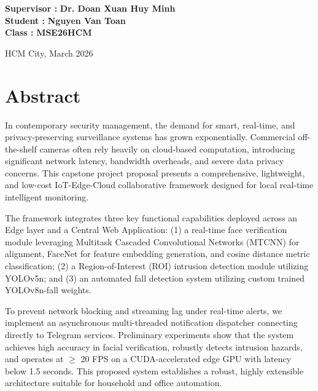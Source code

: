 \documentclass[12pt,a4paper]{article}
\begin{document}
\begin{titlepage}
\begin{center}
        \begin{flushright}
            \textbf{Supervisor :} \textbf{Dr. Doan Xuan Huy Minh} \\
            \vspace{0.5cm}
            \textbf{Student :} \textbf{Nguyen Van Toan} \\
            \vspace{0.5cm}
            \textbf{Class :} \textbf{MSE26HCM}
        \end{flushright}
        
        \vfill
        HCM City, March 2026
    \end{center}
\end{titlepage}
\hypersetup{pageanchor=true}

\newpage

\section*{Abstract}
In contemporary security management, the demand for smart, real-time, and privacy-preserving surveillance systems has grown exponentially. Commercial off-the-shelf cameras often rely heavily on cloud-based computation, introducing significant network latency, bandwidth overheads, and severe data privacy concerns. This capstone project proposal presents a comprehensive, lightweight, and low-cost IoT-Edge-Cloud collaborative framework designed for local real-time intelligent monitoring. 

The framework integrates three key functional capabilities deployed across an Edge layer and a Central Web Application: (1) a real-time face verification module leveraging Multitask Cascaded Convolutional Networks (MTCNN) for alignment, FaceNet for feature embedding generation, and cosine distance metric classification; (2) a Region-of-Interest (ROI) intrusion detection module utilizing YOLOv5n; and (3) an automated fall detection system utilizing custom trained YOLOv8n-fall weights. 

To prevent network blocking and streaming lag under real-time alerts, we implement an asynchronous multi-threaded notification dispatcher connecting directly to Telegram services. Preliminary experiments show that the system achieves high accuracy in facial verification, robustly detects intrusion hazards, and operates at $\ge$ 20 FPS on a CUDA-accelerated edge GPU with latency below 1.5 seconds. This proposed system establishes a robust, highly extensible architecture suitable for household and office automation.
\end{document}
